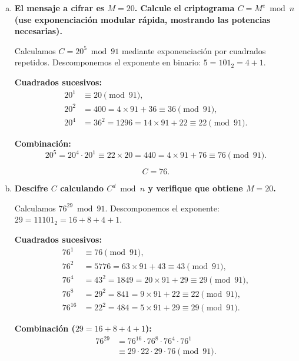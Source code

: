 \begin{enumerate}[a)]
	      Verificación: $5 \times 29 = 145 = 2 \times 72 + 1 \equiv 1 \pmod{72}$.

	      \vspace{3mm}

	\item {\bfseries El mensaje a cifrar es $M = 20$. Calcule el criptograma $C = M^e \bmod n$ (use exponenciación modular rápida, mostrando las potencias necesarias).}

	      Calculamos $C = 20^5 \bmod 91$ mediante exponenciación por cuadrados repetidos. Descomponemos el exponente en binario: $5 = 101_2 = 4 + 1$.

	      \textbf{Cuadrados sucesivos:}
	      \begin{align*}
		      20^1 & \equiv 20 \pmod{91},                                   \\
		      20^2 & = 400 = 4 \times 91 + 36 \equiv 36 \pmod{91},          \\
		      20^4 & = 36^2 = 1296 = 14 \times 91 + 22 \equiv 22 \pmod{91}.
	      \end{align*}

	      \textbf{Combinación:}
	      \[
		      20^5 = 20^4 \cdot 20^1 \equiv 22 \times 20 = 440 = 4 \times 91 + 76 \equiv 76 \pmod{91}.
	      \]

	      \[
		      \boxed{C = 76.}
	      \]

	\item {\bfseries Descifre $C$ calculando $C^d \bmod n$ y verifique que obtiene $M = 20$.}

	      Calculamos $76^{29} \bmod 91$. Descomponemos el exponente: $29 = 11101_2 = 16 + 8 + 4 + 1$.

	      \textbf{Cuadrados sucesivos:}
	      \begin{align*}
		      76^1    & \equiv 76 \pmod{91},                                   \\
		      76^2    & = 5776 = 63 \times 91 + 43 \equiv 43 \pmod{91},        \\
		      76^4    & = 43^2 = 1849 = 20 \times 91 + 29 \equiv 29 \pmod{91}, \\
		      76^8    & = 29^2 = 841 = 9 \times 91 + 22 \equiv 22 \pmod{91},   \\
		      76^{16} & = 22^2 = 484 = 5 \times 91 + 29 \equiv 29 \pmod{91}.
	      \end{align*}

	      \textbf{Combinación ($29 = 16 + 8 + 4 + 1$):}
	      \begin{align*}
		      76^{29} & = 76^{16} \cdot 76^{8} \cdot 76^{4} \cdot 76^{1} \\
		              & \equiv 29 \cdot 22 \cdot 29 \cdot 76 \pmod{91}.
	      \end{align*}


\end{enumerate}
